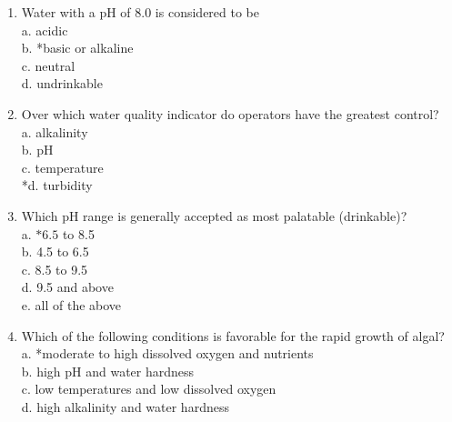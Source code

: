 \begin{enumerate}[1.]
\item Water with a $\mathrm{pH}$ of 8.0 is considered to be\\
a. acidic\\
b. *basic or alkaline\\
c. neutral\\
d. undrinkable\\
\item Over which water quality indicator do operators have the greatest control?\\
a. alkalinity\\
b. $\mathrm{pH}$\\
c. temperature\\
*d. turbidity\\
\item Which $\mathrm{pH}$ range is generally accepted as most palatable (drinkable)?\\
a. $* 6.5$ to 8.5\\
b. 4.5 to 6.5\\
c. 8.5 to 9.5\\
d. 9.5 and above\\
e. all of the above\\
\item Which of the following conditions is favorable for the rapid growth of algal?\\
a. *moderate to high dissolved oxygen and nutrients\\
b. high $\mathrm{pH}$ and water hardness\\
c. low temperatures and low dissolved oxygen\\
d. high alkalinity and water hardness\\


\end{enumerate}
